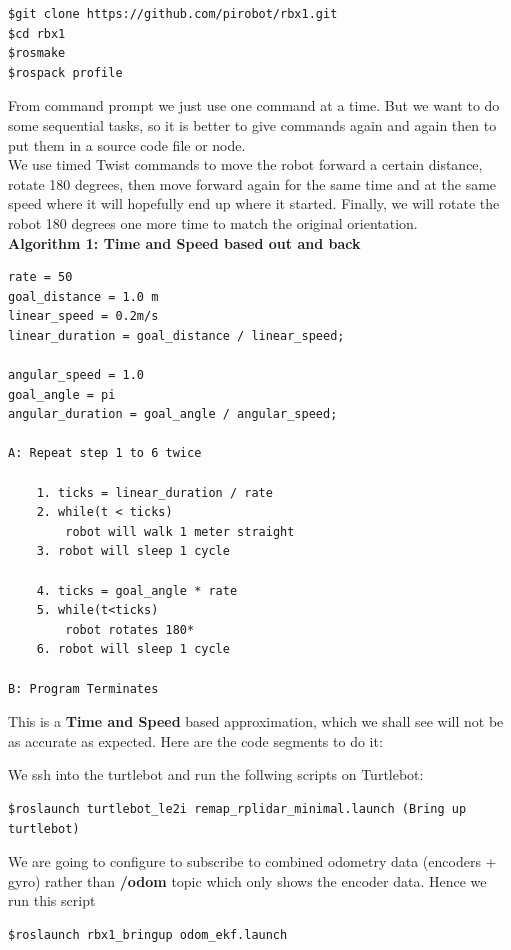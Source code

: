 \documentclass[10pt,a4paper]{article}
\begin{document}
\begin{lstlisting}[frame=single] 
$git clone https://github.com/pirobot/rbx1.git
$cd rbx1
$rosmake
$rospack profile
\end{lstlisting}

From command prompt we just use one command at a time. But we want to do some sequential tasks, so it is better to give commands again and again then to put them in a source code file or node. \\
We use timed Twist commands to move the robot forward a certain distance, rotate 180 degrees, then move forward again for the same time and at the same speed where it will hopefully end up where it started. Finally, we will rotate the robot 180 degrees one more time to match the original orientation.\\

\textbf{Algorithm 1: Time and Speed based out and back}
\begin{lstlisting}[frame=single]
rate = 50
goal_distance = 1.0 m
linear_speed = 0.2m/s
linear_duration = goal_distance / linear_speed;

angular_speed = 1.0
goal_angle = pi
angular_duration = goal_angle / angular_speed;

A: Repeat step 1 to 6 twice

	1. ticks = linear_duration / rate
	2. while(t < ticks)
		robot will walk 1 meter straight
	3. robot will sleep 1 cycle
	
	4. ticks = goal_angle * rate
	5. while(t<ticks)
		robot rotates 180*
	6. robot will sleep 1 cycle
	
B: Program Terminates
\end{lstlisting}

This is a \textbf{Time and Speed} based approximation, which we shall see will not be as accurate as expected. Here are the code segments to do it:

We ssh into the turtlebot and run the follwing scripts
on Turtlebot:
\begin{lstlisting}[frame=single] 
$roslaunch turtlebot_le2i remap_rplidar_minimal.launch (Bring up turtlebot)
\end{lstlisting}
We are going to configure to subscribe to combined odometry data (encoders + gyro) 
rather than \textbf{/odom} topic which only shows the encoder data. Hence we run this script
\begin{lstlisting}[frame=single] 
$roslaunch rbx1_bringup odom_ekf.launch
\end{lstlisting}
\end{document}
